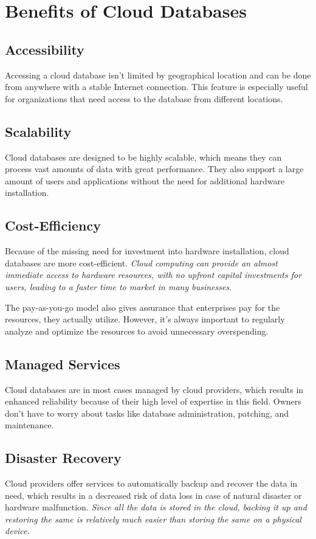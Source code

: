 \documentclass[12pt, a4paper]{article}
\begin{document}
\section{Benefits of Cloud Databases}
    \subsection{Accessibility}
        Accessing a cloud database isn't limited by geographical location and can be done from anywhere with a stable Internet connection. This feature is especially useful for organizations that need access to the database from different locations.
    
    \subsection{Scalability}
        Cloud databases are designed to be highly scalable, which means they can process vast amounts of data with great performance. They also support a large amount of users and applications without the need for additional hardware installation.

    \subsection{Cost-Efficiency}
        Because of the missing need for investment into hardware installation, cloud databases are more cost-efficient. \textit{Cloud computing can provide an almost immediate access to hardware resources, with no upfront capital investments for users, leading to a faster time to market in many businesses.}\cite{12}\par The pay-as-you-go model also gives assurance that enterprises pay for the resources, they actually utilize. However, it's always important to regularly analyze and optimize the resources to avoid unnecessary overspending.
        
    \subsection{Managed Services}
        Cloud databases are in most cases managed by cloud providers, which results in enhanced reliability because of their high level of expertise in this field. Owners don't have to worry about tasks like database administration, patching, and maintenance.
        
    \subsection{Disaster Recovery}
        Cloud providers offer services to automatically backup and recover the data in need, which results in a decreased risk of data loss in case of natural disaster or hardware malfunction. \textit{Since all the data is stored in the cloud, backing it up and restoring the same is relatively much easier than storing the same on a physical device.}\cite{13}
\clearpage
\end{document}
